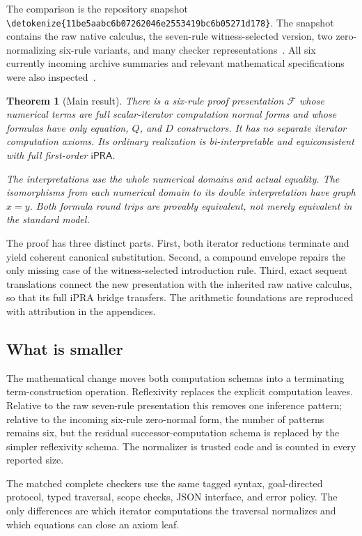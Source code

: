 \documentclass[11pt,letterpaper]{article}
\newtheorem{theorem}{Theorem}[section]
\theoremstyle{definition}
\theoremstyle{remark}
\newcommand{\ipra}{\mathsf{iPRA}}
\newcommand{\file}[1]{\expandafter\nolinkurl\expandafter{\detokenize{#1}}}
\begin{document}
The comparison is the repository snapshot
\file{11be5aabc6b07262046e2553419bc6b05271d178}.
The snapshot contains the raw native calculus, the seven-rule
witness-selected version, two zero-normalizing six-rule variants, and
many checker representations~\cite{snapshot,native,canonical,zero}.
All six currently incoming archive summaries and relevant mathematical
specifications were also inspected~\cite{incoming}.

\begin{theorem}[Main result]
There is a six-rule proof presentation $\mathcal F$ whose numerical terms
are full scalar-iterator computation normal forms and whose formulas have
only equation, $Q$, and $D$ constructors. It has no separate iterator
computation axioms. Its ordinary realization is bi-interpretable and
equiconsistent with full first-order $\ipra$.

The interpretations use the whole numerical domains and actual equality.
The isomorphisms from each numerical domain to its double interpretation
have graph $x=y$. Both formula round trips are provably equivalent, not
merely equivalent in the standard model.
\end{theorem}

The proof has three distinct parts. First, both iterator reductions
terminate and yield coherent canonical substitution. Second, a compound
envelope repairs the only missing case of the witness-selected introduction
rule. Third, exact sequent translations connect the new presentation with
the inherited raw native calculus, so that its full iPRA bridge transfers.
The arithmetic foundations are reproduced with attribution in the appendices.

\subsection{What is smaller}

The mathematical change moves both computation schemas into a terminating
term-construction operation. Reflexivity replaces the explicit computation
leaves. Relative to the raw seven-rule presentation this removes one
inference pattern; relative to the incoming six-rule zero-normal form,
the number of patterns remains six, but the residual successor-computation
schema is replaced by the simpler reflexivity schema.
The normalizer is trusted code and is counted in every reported size.

The matched complete checkers use the same tagged syntax, goal-directed
protocol, typed traversal, scope checks, JSON interface, and error policy.
The only differences are which iterator computations the traversal
normalizes and which equations can close an axiom leaf.
\end{document}

